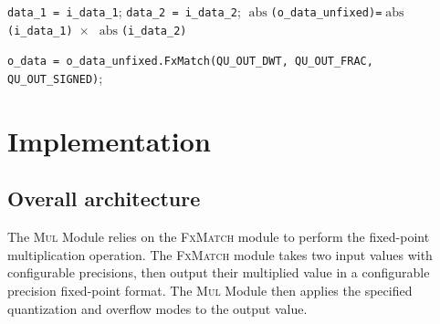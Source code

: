 \documentclass[a4paper, oneside]{report}
\begin{document}
        \begin{algorithm}[H]
            \caption{Module function}
            \BlankLine
            \texttt{data\_1 = i\_data\_1};
            \BlankLine
            \texttt{data\_2 = i\_data\_2};
            \BlankLine
            \texttt{$\operatorname{abs}$(o\_data\_unfixed)=$ \operatorname{abs}$(i\_data\_1) $\times$ $ \operatorname{abs}$(i\_data\_2)}
            \BlankLine
            \BlankLine
         
            \texttt{o\_data = o\_data\_unfixed.FxMatch(\texttt{QU\_OUT\_DWT, QU\_OUT\_FRAC, QU\_OUT\_SIGNED})};
           
        \end{algorithm}

        

    \chapter{Implementation}
        \section{Overall architecture}
                The \textsc{Mul} Module relies on the \textsc{FxMatch} module to perform the fixed-point multiplication operation. The \textsc{FxMatch} module takes two input values with configurable precisions, then output their multiplied value in a configurable precision fixed-point format. The \textsc{Mul} Module then applies the specified quantization and overflow modes to the output value.
\end{document}
